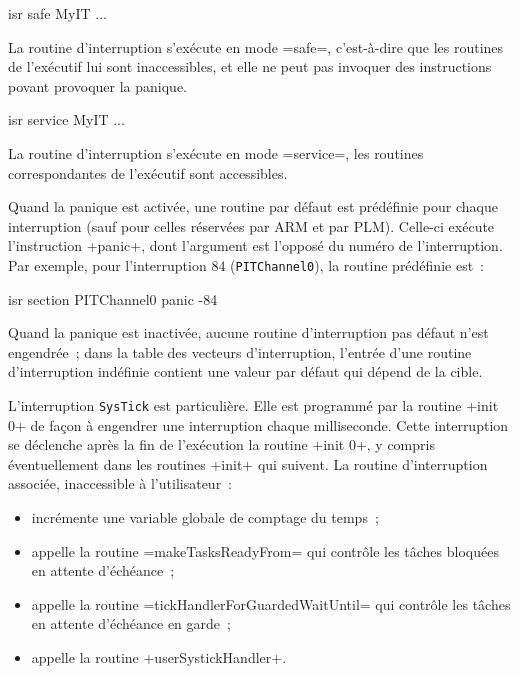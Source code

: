 \begin{PLM}
isr safe MyIT {
  ...
}
\end{PLM}

La routine d'interruption s'exécute en mode \plm=safe=, c'est-à-dire que les routines de l'exécutif lui sont inaccessibles, et elle ne peut pas invoquer des instructions povant provoquer la panique. 




\begin{PLM}
isr service MyIT {
  ...
}
\end{PLM}

La routine d'interruption s'exécute en mode \plm=service=, les routines correspondantes de l'exécutif sont accessibles. 








Quand la panique est activée, une routine par défaut est prédéfinie pour chaque interruption (sauf pour celles réservées par ARM et par PLM). Celle-ci exécute l'instruction \plm+panic+, dont l'argument est l'opposé du numéro de l'interruption. Par exemple, pour l'interruption $84$ (\texttt{PITChannel0}), la routine prédéfinie est~:

\begin{PLM}
isr section PITChannel0 {
  panic -84
}
\end{PLM}



Quand la panique est inactivée, aucune routine d'interruption pas défaut n'est engendrée~; dans la table des vecteurs d'interruption, l'entrée d'une routine d'interruption indéfinie contient une valeur par défaut qui dépend de la cible.






L'interruption \texttt{SysTick} est particulière. Elle est programmé par la routine \plm+init 0+ de façon à engendrer une interruption chaque milliseconde. Cette interruption se déclenche après la fin de l'exécution la routine \plm+init 0+, y compris éventuellement dans les routines \plm+init+ qui suivent. La routine d'interruption associée, inaccessible à l'utilisateur~:
\begin{itemize}
  \item incrémente une variable globale de comptage du temps~;
  \item appelle la routine \plm=makeTasksReadyFrom= qui contrôle les tâches bloquées en attente d'échéance~; 
  \item appelle la routine \plm=tickHandlerForGuardedWaitUntil= qui contrôle les tâches en attente d'échéance en garde~; 
  \item appelle la routine \plm+userSystickHandler+.
\end{itemize}

